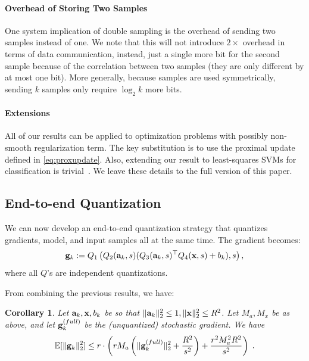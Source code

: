 \documentclass{article}
\def\a{{\bf a}}
\def\g{{\bf g}}
\def\x{{\bf x}}
\def\E{\mathbb{E}}
\newtheorem{corollary}{Corollary}
\begin{document}
\paragraph*{Overhead of Storing Two Samples}
One system implication of double sampling is the overhead of sending
two samples instead of one. We note that this will not introduce $2\times$
overhead in terms of data communication, instead, just a single more bit
for the second sample because of the correlation between two samples (they 
are only different by at most one bit). More generally, because samples
are used symmetrically, sending $k$ samples only require $\log_2 k$ more bits.

\paragraph*{Extensions}

All of our results can be applied to 
optimization problems 
with possibly non-smooth regularization term. The key substitution is to use the proximal update defined in \eqref{eq:proxupdate}.
Also, extending our result to least-squares SVMs for classification is trivial~\cite{Suykens:1999:Book}.
We leave these details to the full version
of this paper.

\subsection{End-to-end Quantization}

We can now develop an end-to-end quantization strategy that
quantizes gradients, model, and input samples all 
at the same time. The gradient becomes:
\[
\g_k := Q_1 \left( Q_2(\a_k, s ) ( Q_3(\a_k, s)^\top Q_4(\x, s) + b_k) , s \right),
\]
\noindent 
where all $Q$'s are independent quantizations.

%

\noindent From combining the previous results, we have:

\begin{corollary}
    \label{cor:full-quantization}
    Let $\a_k, \x, b_k$ be so that $\| \a_k \|_2^2 \leq 1, \| \x \|_2^2 \leq R^2$.
    Let $M_a, M_x$ be as above, and let $\g_k^{(full)}$ be the (unquantized) stochastic gradient.
    We have
    \[
    \E [\| \g_k \|_2^2] \leq r \cdot \left( r M_a \left( \| \g_k^{(full)} \|_2^2 + \frac{R^2}{s^2} \right)  + \frac{r^2 M_a^2 R^2}{s^2} \right) \; .
    \]
\end{corollary}
\end{document}
